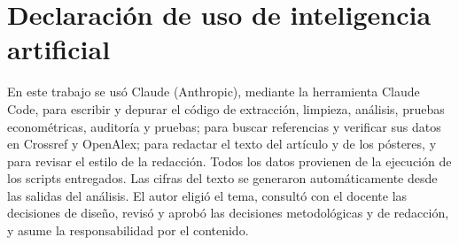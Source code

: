 \section{Declaración de uso de inteligencia artificial}

En este trabajo se usó Claude (Anthropic), mediante la herramienta Claude Code, para escribir y depurar el código de extracción, limpieza, análisis, pruebas econométricas, auditoría y pruebas; para buscar referencias y verificar sus datos en Crossref y OpenAlex; para redactar el texto del artículo y de los pósteres, y para revisar el estilo de la redacción. Todos los datos provienen de la ejecución de los scripts entregados. Las cifras del texto se generaron automáticamente desde las salidas del análisis. El autor eligió el tema, consultó con el docente las decisiones de diseño, revisó y aprobó las decisiones metodológicas y de redacción, y asume la responsabilidad por el contenido.
